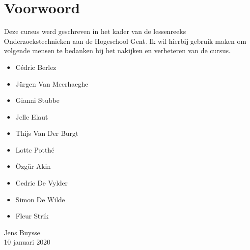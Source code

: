 

\chapter*{Voorwoord}
Deze cursus werd geschreven in het kader van de lessenreeks Onderzoekstechnieken aan de Hogeschool Gent. Ik wil hierbij gebruik maken om volgende mensen te bedanken bij het nakijken en verbeteren van de cursus.
\begin{itemize}
	\item C\'edric Berlez
	\item J\"urgen Van Meerhaeghe
	\item Gianni Stubbe
	\item Jelle Elaut
	\item Thijs Van Der Burgt
	\item Lotte Potth\'e
	\item \"Ozg\"ur Akin
	\item Cedric De Vylder
	\item Simon De Wilde
	\item Fleur Strik
\end{itemize}

\bigskip \bigskip
{\raggedleft	%
Jens Buysse\\
10 januari 2020\\
}
